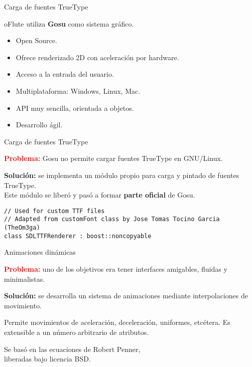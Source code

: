 \begin{frame}[fragile]{Carga de fuentes TrueType}
  \begin{center}
    oFlute utiliza \textbf{Gosu} como sistema gráfico.
    
    \begin{itemize}
    \item Open Source.
    \item Ofrece renderizado 2D con aceleración por hardware.
    \item Acceso a la entrada del usuario.
    \item Multiplataforma: Windows, Linux, Mac.
    \item API muy sencilla, orientada a objetos.
    \item Desarrollo ágil.
    \end{itemize}
  \end{center}
\end{frame}

\begin{frame}[fragile]{Carga de fuentes TrueType}
  \begin{center}
    \textcolor{red}{\textbf{Problema:}} Gosu no permite cargar fuentes TrueType
    en GNU/Linux.

    \pause
    \medskip
    
    \textcolor{dgreen}{\textbf{Solución:}} se implementa un módulo propio para
    carga y pintado de fuentes TrueType. \pause\\[1em]Este módulo se liberó y pasó a
    formar \textbf{parte oficial} de Gosu.
  \end{center}
  \begin{verbatim}
// Used for custom TTF files
// Adapted from customFont class by Jose Tomas Tocino Garcia (TheOm3ga)
class SDLTTFRenderer : boost::noncopyable
  \end{verbatim}
\end{frame}

\begin{frame}{Animaciones dinámicas}
  \begin{center}
    \textcolor{red}{\textbf{Problema:}} uno de los objetivos era tener
    interfaces amigables, fluidas y minimalistas.

    \pause \medskip

    \textcolor{dgreen}{\textbf{Solución:}} se desarrolla un sistema de
    animaciones mediante interpolaciones de movimiento.

    \pause\medskip

    Permite movimientos de aceleración, deceleración, uniformes, etcétera. Es
    extensible a un número arbitrario de atributos.

    \pause\medskip

    Se basó en las ecuaciones de Robert Penner, \\liberadas bajo licencia BSD.
    
  \end{center}  
\end{frame}

